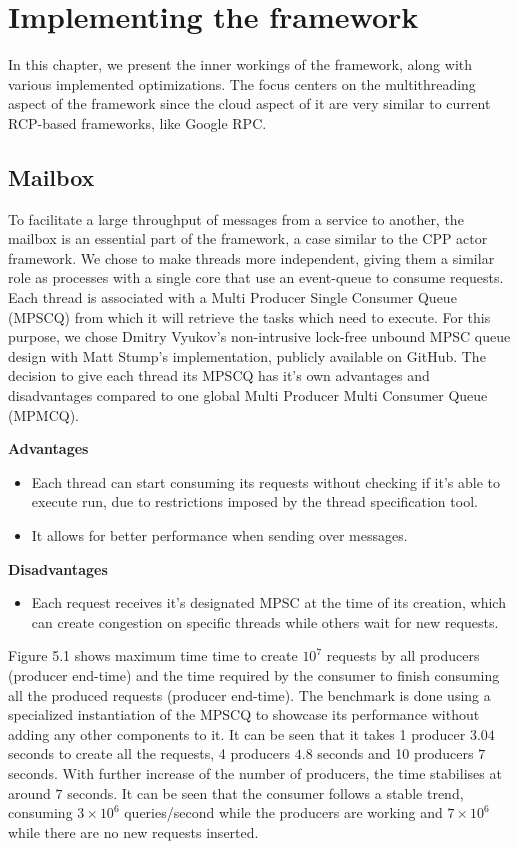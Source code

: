 \chapter{Implementing the framework}
In this chapter, we present the inner workings of the framework, along with various implemented optimizations. The focus centers on the multithreading aspect of the framework since the cloud aspect of it are very similar to current RCP-based frameworks, like Google RPC.
\section{Mailbox}
To facilitate a large throughput of messages from a service to another, the mailbox is an essential part of the framework, a case similar to the CPP actor framework\cite{charousset}.
We chose to make threads more independent, giving them a similar role as processes with a single core that use an event-queue to consume requests. Each thread is associated with a Multi Producer Single Consumer Queue (MPSCQ) from which it will retrieve the tasks which need to execute. For this purpose, we chose Dmitry Vyukov's non-intrusive lock-free unbound MPSC queue \cite{mpscq} design with Matt Stump's implementation, publicly available on GitHub\cite{mpscq-implement}.
The decision to give each thread its MPSCQ has it's own advantages and disadvantages compared to one global Multi Producer Multi Consumer Queue (MPMCQ).

\textbf{Advantages}
\begin{itemize}
\item Each thread can start consuming its requests without checking if it's able to execute run, due to restrictions imposed by the thread specification tool.
\item It allows for better performance when sending over messages.
\end{itemize}

\textbf{Disadvantages}
\begin{itemize}
\item Each request receives it's designated MPSC at the time of its creation, which can create congestion on specific threads while others wait for new requests.
\end{itemize}



Figure 5.1 shows maximum time time to create $10^7$ requests by all producers (producer end-time) and the time required by the consumer to finish consuming all the produced requests (producer end-time). The benchmark is done using a specialized instantiation of the MPSCQ to showcase its performance without adding any other components to it. It can be seen that it takes 1 producer $3.04$ seconds to create all the requests, 4 producers $4.8$ seconds and 10 producers $7$ seconds. With further increase of the number of producers, the time stabilises at around $7$ seconds. It can be seen that the consumer follows a stable trend, consuming $3 \times 10^6$ queries/second while the producers are working and $7 \times 10^6$ while there are no new requests inserted.

